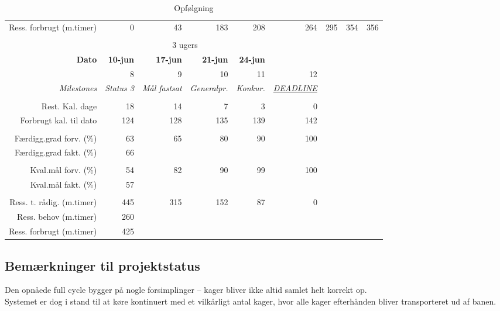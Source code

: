 \begin{sidewaystable}[!htbp]
\begin{footnotesize}
\begin{tabular}{r|rrrrrrrr}
    Ress. forbrugt (m.timer) & 0     & 43    & 183   & 208   & 264   & 295   & 354   & 356 \\%
%
%
\\
 & \multicolumn{4}{c}{3 ugers} \\ \hline
    \textbf{Dato} & \textbf{10-jun} & \textbf{17-jun} & \textbf{21-jun} & \textbf{24-jun} \\
 &       8     & 9     & 10    & 11  & 12 \\
    \textit{Milestones} & \multicolumn{1}{c}{\textit{Status 3}} & \multicolumn{1}{c}{\textit{Mål fastsat}} & \multicolumn{1}{c}{\textit{Generalpr.}} & \multicolumn{1}{c}{\textit{Konkur.}} & \multicolumn{1}{c}{\textit{\underline{DEADLINE}}} \\
 & & & & & \\
    Rest. Kal. dage & 18 & 14    & 7     & 3     & 0 \\
    Forbrugt kal. til dato & 124 & 128   & 135   & 139   & 142 \\
 &       &       &       & & \\
    Færdigg.grad forv. (\%) & 63 & 65    & 80    & 90   & 100 \\
    Færdigg.grad fakt. (\%) & 66 &  &       &       & \\
 &       &       &       & & \\
    Kval.mål forv. (\%) & 54    & 82  & 90    & 99  & 100 \\
    Kval.mål fakt. (\%) & 57    &     &       &     & \\
 &       &       &       &  & \\
    Ress. t. rådig. (m.timer) & 445  & 315   & 152   & 87    & 0 \\
    Ress. behov (m.timer) & 260 &  &       &       & \\
    Ress. forbrugt (m.timer) & 425 &  &       &       &
    \end{tabular}%
\end{footnotesize}
\caption{Opfølgning}\label{tab:opfolgning}
\end{sidewaystable}

\subsection{Bemærkninger til projektstatus}
Den opnåede full cycle bygger på nogle forsimplinger -- kager bliver ikke altid samlet helt korrekt op.\\
Systemet er dog i stand til at køre kontinuert med et vilkårligt antal kager, hvor alle kager efterhånden bliver transporteret ud af banen.